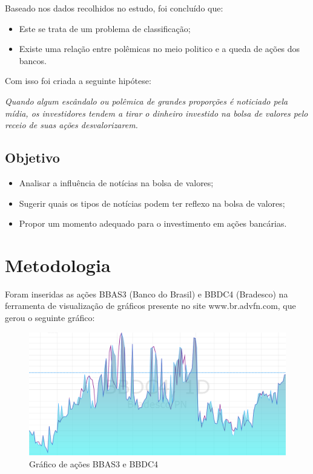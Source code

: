 \documentclass{sigchi}
\begin{document}
 Baseado nos dados recolhidos no estudo, foi concluído que: 
 \begin{itemize}
 
 \item{Este se trata de um problema de classificação;}
 \item{Existe uma relação entre polêmicas no meio politico e a queda de ações dos bancos.}
 
 \end{itemize}
Com isso foi criada a seguinte hipótese: 

\textit{
Quando algum escândalo ou polêmica de grandes proporções é noticiado pela mídia, os investidores tendem a tirar o dinheiro investido na bolsa de valores pelo receio de suas ações desvalorizarem.
}

\subsection{Objetivo}

\begin{itemize}
	\item Analisar a influência de notícias na bolsa de valores;
	\item Sugerir quais os tipos de notícias podem ter reflexo na bolsa de valores;
	\item Propor um momento adequado para o investimento em ações bancárias.
	
\end{itemize}


\section{Metodologia}

Foram inseridas as ações BBAS3 (Banco do Brasil) e BBDC4 (Bradesco) na ferramenta de visualização de gráficos presente no site www.br.advfn.com, que gerou o seguinte gráfico: 

 \begin{figure}[!htb]
\centering
\includegraphics[scale=0.27]{./figures/figura1.png}
\caption{Gráfico de ações BBAS3 e BBDC4}
\label{fig1}
\end{figure}
\end{document}

